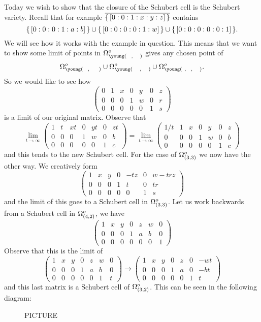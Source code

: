 \documentclass[12pt]{memoir}
\begin{document}
Today we wish to show that the closure of the Schubert cell is the Schubert variety. Recall that for example $\overline{\{\,[0:0:1:x:y:z]\,\}}$ contains 
$$\{\,[0:0:0:1:a:b]\,\}\cup\{\,[0:0:0:0:1:w]\,\}\cup\{\,[0:0:0:0:0:1]\,\}.$$
We will see how it works with the example in question. This means that we want to show some limit of points in $\Om_{\young(~~,~~~)}^o$ gives any chosen point of 
$$\Om_{\young(~~,~~~~)}^o\cup\Om_{\young(~~~,~~~)}^o\cup\Om_{\young(~,~~,~~~)}^o.$$
So we would like to see how 
$$\begin{pmatrix}
    0&1&x&0&y&0&z\\
    0&0&0&1&w&0&r\\
    0&0&0&0&0&1&s
\end{pmatrix}$$
is a limit of our original matrix. Observe that 
$$\lim_{t\to\infty}\begin{pmatrix}
    1&t&xt&0&yt&0&zt\\
    0&0&0&1&w&0&b\\
    0&0&0&0&0&1&c
\end{pmatrix}=\lim_{t\to\infty}\begin{pmatrix}
    1/t&1&x&0&y&0&z\\
    0&0&0&1&w&0&b\\
    0&0&0&0&0&1&c
\end{pmatrix}$$
and this tends to the new Schubert cell. For the case of $\Omega_{(3,3)}^o$ we now have the other way. We creatively form 
$$\begin{pmatrix}
    1&x&y&0&-tz&0&w-trz\\
    0&0&0&1&t&0&tr\\
    0&0&0&0&0&1&s
\end{pmatrix}$$
and the limit of this goes to a Schubert cell in $\Omega_{(3,3)}^o$. Let us work backwards from a Schubert cell in $\Omega_{(4,2)}^o$, we have 
$$\begin{pmatrix}
    1&x&y&0&z&w&0\\
    0&0&0&1&a&b&0\\
    0&0&0&0&0&0&1
\end{pmatrix}$$
Observe that this is the limit of 
$$\begin{pmatrix}
    1&x&y&0&z&w&0\\
    0&0&0&1&a&b&0\\
    0&0&0&0&0&1&t
\end{pmatrix}\to\begin{pmatrix}
    1&x&y&0&z&0&-wt\\
    0&0&0&1&a&0&-bt\\
    0&0&0&0&0&1&t
\end{pmatrix}$$
and this last matrix is a Schubert cell of $\Omega_{(3,2)}^o$. This can be seen in the following diagram:
\begin{figure}[h!]
    PICTURE
\end{figure}
\end{document}
